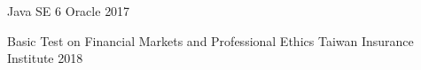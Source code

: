 

\begin{cvhonors}

  \cvhonor
    {Java SE 6} %
    {Oracle} %
    {} %
    {2017} %

  \cvhonor
    {Basic Test on Financial Markets and Professional Ethics} %
    {Taiwan Insurance Institute} %
    {} %
    {2018} %





\end{cvhonors}
